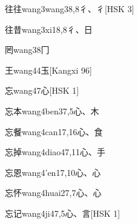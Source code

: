 \begin{EntryWithPhonetic}{往往}{wang3wang3}{8,8}{⼻、⼻}[HSK 3]
\end{EntryWithPhonetic}

\begin{EntryWithPhonetic}{往昔}{wang3xi1}{8,8}{⼻、⽇}
\end{EntryWithPhonetic}

\begin{EntryWithPhonetic}{罔}{wang3}{8}{⼌}
\end{EntryWithPhonetic}

\begin{EntryWithPhonetic}{王}{wang4}{4}{⽟}[Kangxi 96]
\end{EntryWithPhonetic}

\begin{EntryWithPhonetic}{忘}{wang4}{7}{⼼}[HSK 1]
\end{EntryWithPhonetic}

\begin{EntryWithPhonetic}{忘本}{wang4ben3}{7,5}{⼼、⽊}
\end{EntryWithPhonetic}

\begin{EntryWithPhonetic}{忘餐}{wang4can1}{7,16}{⼼、⾷}
\end{EntryWithPhonetic}

\begin{EntryWithPhonetic}{忘掉}{wang4diao4}{7,11}{⼼、⼿}
\end{EntryWithPhonetic}

\begin{EntryWithPhonetic}{忘恩}{wang4'en1}{7,10}{⼼、⼼}
\end{EntryWithPhonetic}

\begin{EntryWithPhonetic}{忘怀}{wang4huai2}{7,7}{⼼、⼼}
\end{EntryWithPhonetic}

\begin{EntryWithPhonetic}{忘记}{wang4ji4}{7,5}{⼼、⾔}[HSK 1]
\end{EntryWithPhonetic}

